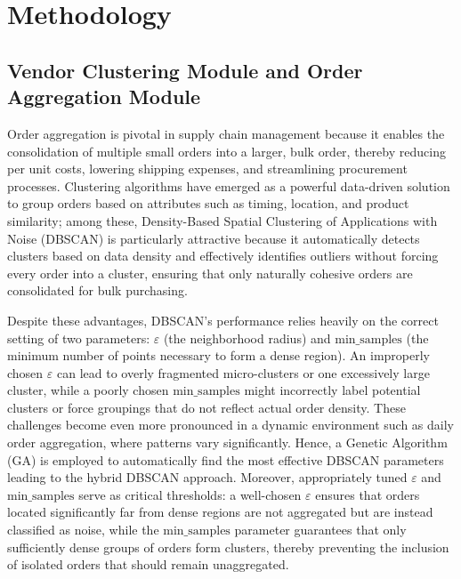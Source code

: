 \chapter{Methodology}

\section{Vendor Clustering Module and Order Aggregation Module}

Order aggregation is pivotal in supply chain management because it enables the consolidation of multiple small orders into a larger, bulk order, thereby reducing per unit costs, lowering shipping expenses, and streamlining procurement processes. Clustering algorithms have emerged as a powerful data-driven solution to group orders based on attributes such as timing, location, and product similarity; among these, Density-Based Spatial Clustering\cite{ester1996density} of Applications with Noise (DBSCAN) is particularly attractive because it automatically detects clusters based on data density and effectively identifies outliers without forcing every order into a cluster, ensuring that only naturally cohesive orders are consolidated for bulk purchasing.

Despite these advantages, DBSCAN's\cite{john2023exploration} performance relies heavily on the correct setting of two parameters: $\varepsilon$ (the neighborhood radius) and $\text{min\_samples}$ (the minimum number of points necessary to form a dense region). An improperly chosen $\varepsilon$ can lead to overly fragmented micro-clusters or one excessively large cluster, while a poorly chosen $\text{min\_samples}$ might incorrectly label potential clusters or force groupings that do not reflect actual order density. These challenges become even more pronounced in a dynamic environment such as daily order aggregation, where patterns vary significantly. Hence, a Genetic Algorithm (GA)\cite{perafan2022performance} is employed to automatically find the most effective DBSCAN parameters leading to the hybrid DBSCAN approach. Moreover, appropriately tuned $\varepsilon$ and $\text{min\_samples}$ serve as critical thresholds: a well-chosen $\varepsilon$ ensures that orders located significantly far from dense regions are not aggregated but are instead classified as noise, while the $\text{min\_samples}$ parameter guarantees that only sufficiently dense groups of orders form clusters, thereby preventing the inclusion of isolated orders that should remain unaggregated.

